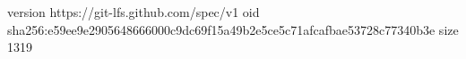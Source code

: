 version https://git-lfs.github.com/spec/v1
oid sha256:e59ee9e2905648666000c9dc69f15a49b2e5ce5c71afcafbae53728c77340b3e
size 1319
